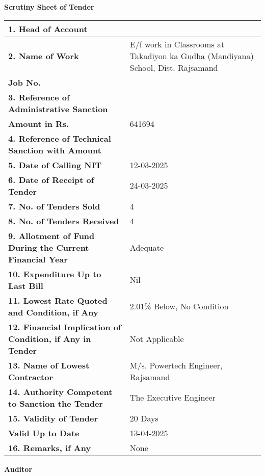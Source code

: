 \documentclass[a4paper]{article}
\begin{document}
\begin{center}
    \textbf{\Large Scrutiny Sheet of Tender}
\end{center}

\begin{tabular}{|p{}|p{}|}
    \hline
    \large \textbf{1. Head of Account} & \large \\
    \hline
    \large \textbf{2. Name of Work} & \large E/f work in Classrooms at Takadiyon ka Gudha (Mandiyana) School, Dist. Rajsamand \\
    \large \textbf{Job No.} & \large \\
    \hline
    \large \textbf{3. Reference of Administrative Sanction} & \large \\
    \large \textbf{Amount in Rs.} & \large 641694 \\
    \hline
    \large \textbf{4. Reference of Technical Sanction with Amount} & \large \\
    \hline
    \large \textbf{5. Date of Calling NIT} & \large 12-03-2025 \\
    \hline
    \large \textbf{6. Date of Receipt of Tender} & \large 24-03-2025 \\
    \hline
    \large \textbf{7. No. of Tenders Sold} & \large 4 \\
    \hline
    \large \textbf{8. No. of Tenders Received} & \large 4 \\
    \hline
    \large \textbf{9. Allotment of Fund During the Current Financial Year} & \large Adequate \\
    \hline
    \large \textbf{10. Expenditure Up to Last Bill} & \large Nil \\
    \hline
    \large \textbf{11. Lowest Rate Quoted and Condition, if Any} & \large 2.01\% Below, No Condition \\
    \hline
    \large \textbf{12. Financial Implication of Condition, if Any in Tender} & \large Not Applicable \\
    \hline
    \large \textbf{13. Name of Lowest Contractor} & \large M/s. Powertech Engineer, Rajsamand \\
    \hline
    \large \textbf{14. Authority Competent to Sanction the Tender} & \large The Executive Engineer \\
    \hline
    \large \textbf{15. Validity of Tender} & \large 20 Days \\
    \large \textbf{Valid Up to Date} & \large 13-04-2025 \\
    \hline
    \large \textbf{16. Remarks, if Any} & \large None \\
    \hline
\end{tabular}

\vspace{1cm}
\begin{flushleft}
    \large \textbf{Auditor}
\end{flushleft}
\end{document}
